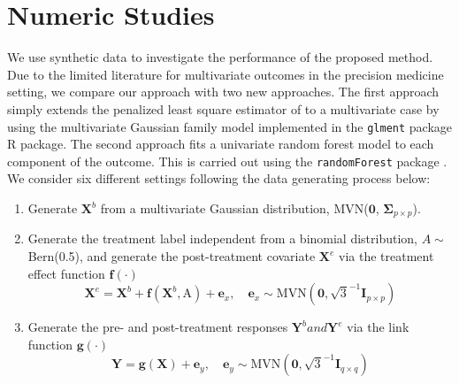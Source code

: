 \documentclass[smallextended]{svjour3}
\begin{document}
\section{Numeric Studies}\label{Sim}

We use synthetic data to investigate the performance of the proposed method. Due to the limited literature for multivariate outcomes in the precision medicine setting, we compare our approach with two new approaches. The first approach simply extends the penalized least square estimator of \citep{qian2011performance} to a multivariate case by using the multivariate Gaussian family model implemented in the \texttt{glment} package \citep{glmnet} R package. The second approach fits a univariate random forest model to each component of the outcome. This is carried out using the \texttt{randomForest} package \citep{liaw2002classification}. We consider six different settings following the data generating process below:
\begin{enumerate}
    \item Generate $\bm{X}^b$ from a multivariate Gaussian distribution, MVN($\bm 0$, $\bm \Sigma_{p \times p}$).
    \item Generate the treatment label independent from a binomial distribution, $A \sim$ Bern(0.5), and generate the post-treatment covariate $\bm X^e$ via the treatment effect function $\bm f(\cdot)$
    \[
        \bm{X}^e = \bm{X}^b + \bm f(\textbf{X}^b, \text{A}) + \textbf{e}_x, \quad \textbf{e}_x \sim \text{MVN}(\bm 0, \sqrt{3}^{-1} \bm I_{p \times p})
    \]
    \item Generate the pre- and post-treatment responses $\bm{Y}^b and \bm{Y}^e$ via the link function $\bm g(\cdot)$
    \[
        \bm{Y} = \bm g(\bm{X}) + \textbf{e}_y, \quad \textbf{e}_y \sim \text{MVN}(\bm 0, \sqrt{3}^{-1} \bm I_{q \times q})
    \]
\end{enumerate}
\end{document}
